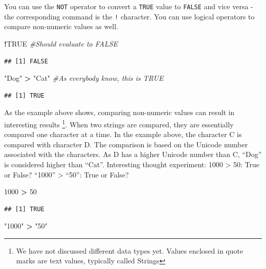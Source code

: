 \documentclass[]{krantz}
\makeatletter
\newenvironment{Shaded}{\begin{snugshade}}{\end{snugshade}}
\newcommand{\DecValTok}[1]{\textcolor[rgb]{0.06,0.06,0.06}{#1}}
\newcommand{\StringTok}[1]{\textcolor[rgb]{0.5,0.5,0.5}{#1}}
\newcommand{\CommentTok}[1]{\textcolor[rgb]{0.37,0.37,0.37}{\textit{#1}}}
\newcommand{\OtherTok}[1]{\textcolor[rgb]{0.37,0.37,0.37}{#1}}
\newcommand{\OperatorTok}[1]{\textcolor[rgb]{0.43,0.43,0.43}{\textbf{#1}}}
\newenvironment{kframe}{%
\medskip{}
\setlength{\fboxsep}{.8em}
 \def\at@end@of@kframe{}%
 \ifinner\ifhmode%
  \def\at@end@of@kframe{\end{minipage}}%
  \begin{minipage}{\columnwidth}%
 \fi\fi%
 \def\FrameCommand##1{\hskip\@totalleftmargin \hskip-\fboxsep
 \colorbox{shadecolor}{##1}\hskip-\fboxsep
     \hskip-\linewidth \hskip-\@totalleftmargin \hskip\columnwidth}%
 \MakeFramed {\advance\hsize-\width
   \@totalleftmargin\z@ \linewidth\hsize
   \@setminipage}}%
 {\par\unskip\endMakeFramed%
 \at@end@of@kframe}
\renewenvironment{Shaded}{\begin{kframe}}{\end{kframe}}
\makeatother
\begin{document}
You can use the \texttt{NOT} operator to convert a \texttt{TRUE} value
to \texttt{FALSE} and vice versa - the corresponding command is the
\texttt{!} character. You can use logical operators to compare
non-numeric values as well.

\begin{Shaded}
\begin{Highlighting}[]
\OperatorTok{!}\OtherTok{TRUE} \CommentTok{#Should evaluate to FALSE}
\end{Highlighting}
\end{Shaded}

\begin{verbatim}
## [1] FALSE
\end{verbatim}

\begin{Shaded}
\begin{Highlighting}[]
\StringTok{"Dog"} \OperatorTok{>}\StringTok{ "Cat"} \CommentTok{#As everybody know, this is TRUE}
\end{Highlighting}
\end{Shaded}

\begin{verbatim}
## [1] TRUE
\end{verbatim}

As the example above shows, comparing non-numeric values can result in
interesting results \footnote{We have not discussed different data types
  yet. Values enclosed in quote marks are text values, typically called
  Strings}. When two strings are compared, they are essentially compared
one character at a time. In the example above, the character C is
compared with character D. The comparison is based on the Unicode number
associated with the characters. As D has a higher Unicode number than C,
``Dog'' is considered higher than ``Cat''. Interesting thought
experiment: 1000 \textgreater{} 50: True or False? ``1000''
\textgreater{} ``50'': True or False?

\begin{Shaded}
\begin{Highlighting}[]
\DecValTok{1000} \OperatorTok{>}\StringTok{ }\DecValTok{50}
\end{Highlighting}
\end{Shaded}

\begin{verbatim}
## [1] TRUE
\end{verbatim}

\begin{Shaded}
\begin{Highlighting}[]
\StringTok{"1000"} \OperatorTok{>}\StringTok{ "50"}
\end{Highlighting}
\end{Shaded}
\end{document}
